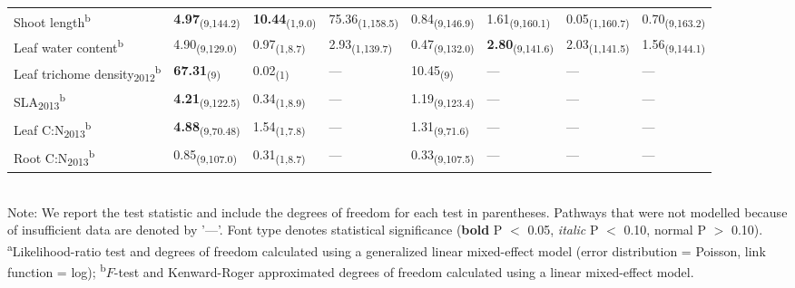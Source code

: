 \documentclass[11pt]{article}
\begin{document}
\begin{table}
\begin{tabular}{@{}llllllll@{}}
Shoot length\textsuperscript{b}              & \textbf{4.97}\textsubscript{(9,144.2)} & \textbf{10.44}\textsubscript{(1,9.0)} & 75.36\textsubscript{(1,158.5)}  & 0.84\textsubscript{(9,146.9)} & 1.61\textsubscript{(9,160.1)} & 0.05\textsubscript{(1,160.7)}  & 0.70\textsubscript{(9,163.2)} \\
Leaf water content\textsuperscript{b}        & 4.90\textsubscript{(9,129.0)} & 0.97\textsubscript{(1,8.7)}  & 2.93\textsubscript{(1,139.7)}   & 0.47\textsubscript{(9,132.0)} & \textbf{2.80}\textsubscript{(9,141.6)} & 2.03\textsubscript{(1,141.5)}  & 1.56\textsubscript{(9,144.1)} \\
Leaf trichome density\textsubscript{2012}\textsuperscript{b} & \textbf{67.31}\textsubscript{(9)}      & 0.02\textsubscript{(1)}      & ---               & 10.45\textsubscript{(9)}      & ---             & ---              & ---             \\
SLA\textsubscript{2013}\textsuperscript{b}                   & \textbf{4.21}\textsubscript{(9,122.5)} & 0.34\textsubscript{(1,8.9)}  & ---               & 1.19\textsubscript{(9,123.4)} & ---             & ---              & ---             \\
Leaf C:N\textsubscript{2013}\textsuperscript{b}              & \textbf{4.88}\textsubscript{(9,70.48)} & 1.54\textsubscript{(1,7.8)}  & ---               & 1.31\textsubscript{(9,71.6)}  & ---             & ---              & ---             \\
Root C:N\textsubscript{2013}\textsuperscript{b}              & 0.85\textsubscript{(9,107.0)} & 0.31\textsubscript{(1,8.7)}  & ---               & 0.33\textsubscript{(9,107.5)} & ---             & ---              & ---    \\
\bottomrule
\end{tabular}
\bigskip{}
\\
{\footnotesize Note: We report the test statistic and include the degrees of freedom for each test in parentheses. Pathways that were not modelled because of insufficient data are denoted by '---'. Font type denotes statistical significance (\textbf{bold} P $<$ 0.05, \textit{italic} P $<$ 0.10, normal P $>$ 0.10). \textsuperscript{a}Likelihood-ratio test and degrees of freedom calculated using a generalized linear mixed-effect model (error distribution = Poisson, link function = log); \textsuperscript{b}$F$-test and Kenward-Roger approximated degrees of freedom calculated using a linear mixed-effect model.}
\end{table}
\end{document}
